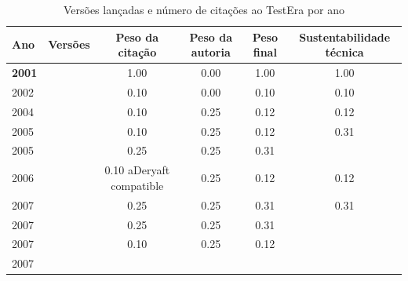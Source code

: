 \begin{table}[H]
\caption{Versões lançadas e número de citações ao TestEra por ano}
\centering
\begin{tabular}{| l | c | c | c | c | c |}
  \hline
  Ano & Versões & Peso da citação & Peso da autoria & Peso final & Sustentabilidade técnica \\
  \hline
            {\bf 2001}
          &
          
          &
          1.00
          &
          0.00
          &
          1.00
          &
            {\color{blue} 1.00}
          \\
\hline
            2002
          &
          
          &
          0.10
          &
          0.00
          &
          0.10
          &
            {\color{red} 0.10}
          \\
\hline
            2004
          &
          
          &
          0.10
          &
          0.25
          &
          0.12
          &
            {\color{red} 0.12}
          \\
\hline
            2005
          &
          
          &
          0.10
          &
          0.25
          &
          0.12
          &
            {\color{red} 0.31}
          \\
            2005
          &
          
          &
          0.25
          &
          0.25
          &
          0.31
          &
          \\
\hline
            2006
          &
          
          &
          0.10
            {\tiny aDeryaft compatible}
          &
          0.25
          &
          0.12
          &
            {\color{red} 0.12}
          \\
\hline
            2007
          &
          
          &
          0.25
          &
          0.25
          &
          0.31
          &
            {\color{red} 0.31}
          \\
            2007
          &
          
          &
          0.25
          &
          0.25
          &
          0.31
          &
          \\
            2007
          &
          
          &
          0.10
          &
          0.25
          &
          0.12
          &
          \\
            2007
          &
          

\end{tabular}
\end{table}
